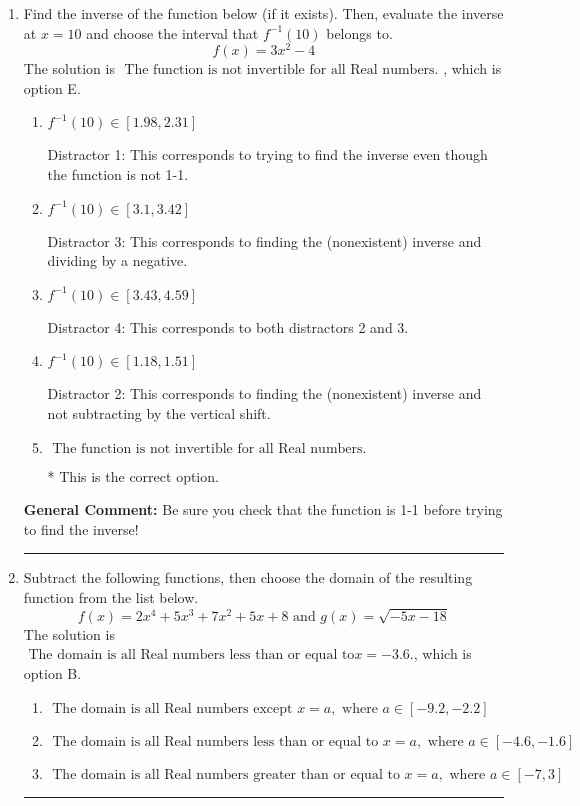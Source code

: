 \documentclass{extbook}[14pt]
\newcommand{\litem}[1]{\item #1

\rule{\textwidth}{0.4pt}}
\begin{document}
\begin{enumerate}\litem{
Find the inverse of the function below (if it exists). Then, evaluate the inverse at $x = 10$ and choose the interval that $f^{-1}(10)$ belongs to.
\[ f(x) = 3 x^2 - 4 \]The solution is \( \text{ The function is not invertible for all Real numbers. } \), which is option E.\begin{enumerate}[label=\Alph*.]
\item \( f^{-1}(10) \in [1.98, 2.31] \)

 Distractor 1: This corresponds to trying to find the inverse even though the function is not 1-1. 
\item \( f^{-1}(10) \in [3.1, 3.42] \)

 Distractor 3: This corresponds to finding the (nonexistent) inverse and dividing by a negative.
\item \( f^{-1}(10) \in [3.43, 4.59] \)

 Distractor 4: This corresponds to both distractors 2 and 3.
\item \( f^{-1}(10) \in [1.18, 1.51] \)

 Distractor 2: This corresponds to finding the (nonexistent) inverse and not subtracting by the vertical shift.
\item \( \text{ The function is not invertible for all Real numbers. } \)

* This is the correct option.
\end{enumerate}

\textbf{General Comment:} Be sure you check that the function is 1-1 before trying to find the inverse!
}
\litem{
Subtract the following functions, then choose the domain of the resulting function from the list below.
\[ f(x) = 2x^{4} +5 x^{3} +7 x^{2} +5 x + 8 \text{ and } g(x) = \sqrt{-5x-18}  \]The solution is \( \text{ The domain is all Real numbers less than or equal to} x = -3.6. \), which is option B.\begin{enumerate}[label=\Alph*.]
\item \( \text{ The domain is all Real numbers except } x = a, \text{ where } a \in [-9.2, -2.2] \)


\item \( \text{ The domain is all Real numbers less than or equal to } x = a, \text{ where } a \in [-4.6, -1.6] \)


\item \( \text{ The domain is all Real numbers greater than or equal to } x = a, \text{ where } a \in [-7, 3] \)



\end{enumerate}}
\end{enumerate}
\end{document}
